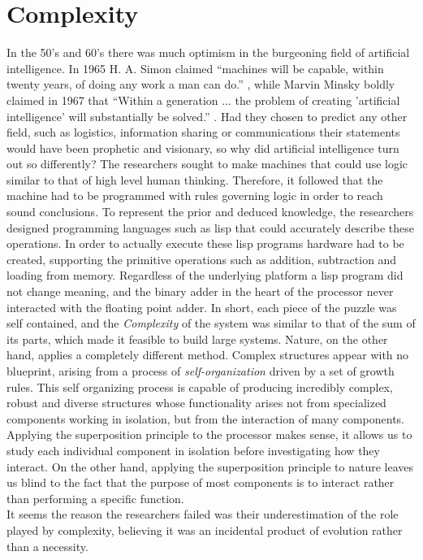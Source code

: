 \section{Complexity}
In the 50's and 60's there was much optimism in the burgeoning field of
artificial intelligence. In 1965 H. A. Simon claimed ``machines will be capable,
within twenty years, of doing any work a man can
do.''\cite{vardi_artificial_nodate} , while Marvin Minsky boldly claimed in 1967
that ``Within a generation ... the problem of creating 'artificial intelligence'
will substantially be solved.'' \cite{noauthor_marvin_nodate}.
Had they chosen to predict any other field, such as logistics, information
sharing or communications their statements would have been prophetic and
visionary, so why did artificial intelligence turn out so differently?
%
The researchers sought to make machines that could use logic similar to that of
high level human thinking.
%
Therefore, it followed that the machine had to be programmed with rules
governing logic in order to reach sound conclusions.
%
To represent the prior and deduced knowledge, the researchers designed
programming languages such as lisp that could accurately describe these
operations.
%
In order to actually execute these lisp programs hardware had to be created,
supporting the primitive operations such as addition, subtraction and loading
from memory.
%
Regardless of the underlying platform a lisp program did not change meaning, and
the binary adder in the heart of the processor never interacted with the
floating point adder. In short, each piece of the puzzle was self contained,
and the \emph{Complexity} of the system was similar to that of the sum of its
parts, which made it feasible to build large systems.
%
Nature, on the other hand, applies a completely different method.
Complex structures appear with no blueprint, arising from a process of
\emph{self-organization} driven by a set of growth rules. This self organizing
process is capable of producing incredibly complex, robust and diverse
structures whose functionality arises not from specialized components working in
isolation, but from the interaction of many components.
%
Applying the superposition principle to the processor makes sense, it allows us
to study each individual component in isolation before investigating how they
interact.
%
On the other hand, applying the superposition principle to nature leaves us
blind to the fact that the purpose of most components is to interact rather than
performing a specific function.\\
It seems the reason the researchers failed was their underestimation of the role
played by complexity, believing it was an incidental product of evolution rather
than a necessity.

